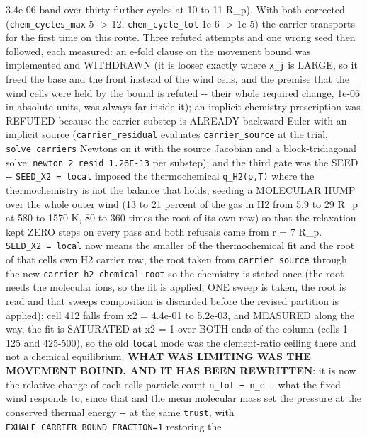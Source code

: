 \documentclass[english,a4paper]{my_memo}
\begin{document}
\begin{itemize}
  3.4e-06 band over thirty further cycles at 10 to 11 R\_p). With both corrected
  (\texttt{chem\_cycles\_max} 5 -\textgreater{} 12, \texttt{chem\_cycle\_tol} 1e-6 -\textgreater{} 1e-5) the carrier
  transports for the first time on this route. Three refuted attempts and one
  wrong seed then followed, each measured: an e-fold clause on the movement
  bound was implemented and WITHDRAWN (it is looser exactly where \texttt{x\_j} is
  LARGE, so it freed the base and the front instead of the wind cells, and the
  premise that the wind cells were held by the bound is refuted -\/- their whole
  required change, 1e-06 in absolute units, was always far inside it); an
  implicit-chemistry prescription was REFUTED because the carrier substep is
  ALREADY backward Euler with an implicit source (\texttt{carrier\_residual} evaluates
  \texttt{carrier\_source} at the trial, \texttt{solve\_carriers} Newtons on it with the source
  Jacobian and a block-tridiagonal solve; \texttt{newton\ 2\ resid\ 1.26E-13} per
  substep); and the third gate was the SEED -\/- \texttt{SEED\_X2\ =\ local} imposed the
  thermochemical \texttt{q\_H2(p,T)} where the thermochemistry is not the balance that
  holds, seeding a MOLECULAR HUMP over the whole outer wind (13 to 21 percent
  of the gas in H2 from 5.9 to 29 R\_p at 580 to 1570 K, 80 to 360 times the
  root of its own row) so that the relaxation kept ZERO steps on every pass and
  both refusals came from r = 7 R\_p. \texttt{SEED\_X2\ =\ local} now means the smaller of
  the thermochemical fit and the root of that cell\textquotesingle s own H2 carrier row, the
  root taken from \texttt{carrier\_source} through the new \texttt{carrier\_h2\_chemical\_root}
  so the chemistry is stated once (the root needs the molecular ions, so the
  fit is applied, ONE sweep is taken, the root is read and that sweep\textquotesingle s
  composition is discarded before the revised partition is applied); cell 412
  falls from x2 = 4.4e-01 to 5.2e-03, and MEASURED along the way, the fit is
  SATURATED at x2 = 1 over BOTH ends of the column (cells 1-125 and 425-500),
  so the old \texttt{local} mode was the element-ratio ceiling there and not a
  chemical equilibrium. \textbf{WHAT WAS LIMITING WAS THE MOVEMENT BOUND, AND IT HAS
  BEEN REWRITTEN}: it is now the relative change of each cell\textquotesingle s particle count
  \texttt{n\_tot\ +\ n\_e} -\/- what the fixed wind responds to, since that and the mean
  molecular mass set the pressure at the conserved thermal energy -\/- at the
  same \texttt{trust}, with \texttt{EXHALE\_CARRIER\_BOUND\_FRACTION=1} restoring the

\end{itemize}
\end{document}
